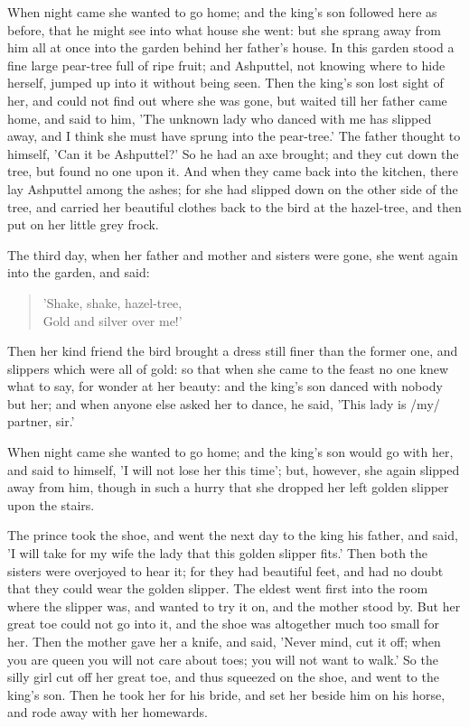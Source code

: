 \documentclass[12pt]{book}
\begin{document}
When night came she wanted to go home; and the king's son followed
here as before, that he might see into what house she went: but she
sprang away from him all at once into the garden behind her father's
house. In this garden stood a fine large pear-tree full of ripe fruit;
and Ashputtel, not knowing where to hide herself, jumped up into it
without being seen. Then the king's son lost sight of her, and could
not find out where she was gone, but waited till her father came home,
and said to him, 'The unknown lady who danced with me has slipped
away, and I think she must have sprung into the pear-tree.' The father
thought to himself, 'Can it be Ashputtel?' So he had an axe brought;
and they cut down the tree, but found no one upon it. And when they
came back into the kitchen, there lay Ashputtel among the ashes; for
she had slipped down on the other side of the tree, and carried her
beautiful clothes back to the bird at the hazel-tree, and then put on
her little grey frock.

The third day, when her father and mother and sisters were gone, she
went again into the garden, and said:

\begin{verse}
 'Shake, shake, hazel-tree,\\
  Gold and silver over me!'
\end{verse}

Then her kind friend the bird brought a dress still finer than the
former one, and slippers which were all of gold: so that when she came
to the feast no one knew what to say, for wonder at her beauty: and
the king's son danced with nobody but her; and when anyone else asked
her to dance, he said, 'This lady is /my/ partner, sir.'

When night came she wanted to go home; and the king's son would go
with her, and said to himself, 'I will not lose her this time'; but,
however, she again slipped away from him, though in such a hurry that
she dropped her left golden slipper upon the stairs.

The prince took the shoe, and went the next day to the king his
father, and said, 'I will take for my wife the lady that this golden
slipper fits.' Then both the sisters were overjoyed to hear it; for
they had beautiful feet, and had no doubt that they could wear the
golden slipper. The eldest went first into the room where the slipper
was, and wanted to try it on, and the mother stood by. But her great
toe could not go into it, and the shoe was altogether much too small
for her. Then the mother gave her a knife, and said, 'Never mind, cut
it off; when you are queen you will not care about toes; you will not
want to walk.' So the silly girl cut off her great toe, and thus
squeezed on the shoe, and went to the king's son. Then he took her for
his bride, and set her beside him on his horse, and rode away with her
homewards.
\end{document}
